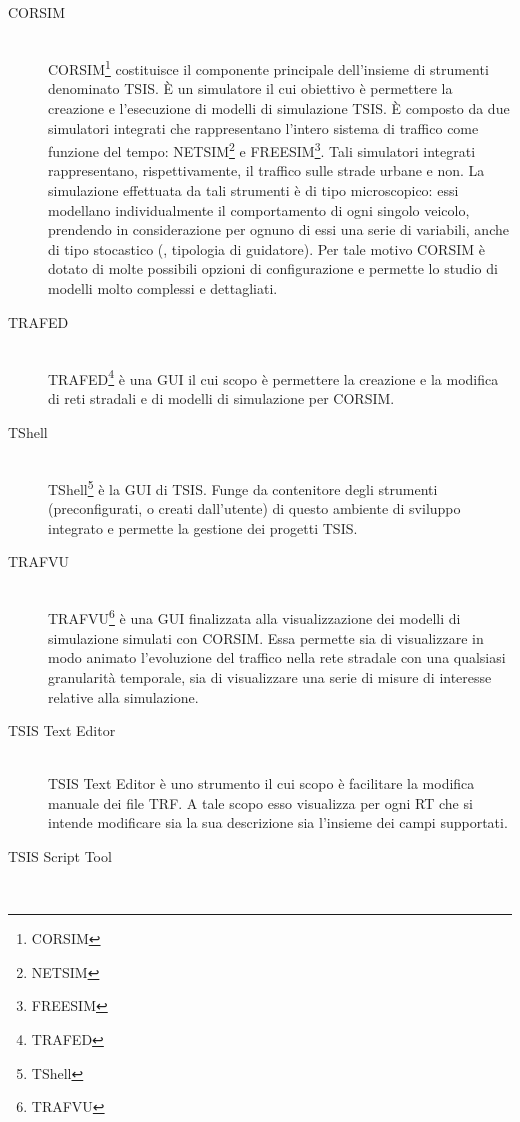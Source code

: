 \begin{description}
\item[CORSIM] \hfill \\
\acs{CORSIM}\footnote{\acf{CORSIM}} costituisce il componente principale dell'insieme di strumenti denominato \acs{TSIS}. È un simulatore il cui obiettivo è permettere la creazione e l'esecuzione di modelli di simulazione \acs{TSIS}. È composto da due simulatori integrati che rappresentano l'intero sistema di traffico come funzione del tempo: \acs{NETSIM}\footnote{\acf{NETSIM}} e \acs{FREESIM}\footnote{\acf{FREESIM}}. Tali simulatori integrati rappresentano, rispettivamente, il traffico sulle strade urbane e non. La simulazione effettuata da tali strumenti è di tipo microscopico: essi modellano individualmente il comportamento di ogni singolo veicolo, prendendo in considerazione per ognuno di essi una serie di variabili, anche di tipo stocastico (\eg{}, tipologia di guidatore). Per tale motivo \acs{CORSIM} è dotato di molte possibili opzioni di configurazione e permette lo studio di modelli molto complessi e dettagliati.
\item[TRAFED] \hfill \\
\acs{TRAFED}\footnote{\acf{TRAFED}} è una \acs{GUI} il cui scopo è permettere la creazione e la modifica di reti stradali e di modelli di simulazione per \acs{CORSIM}.
\item[TShell] \hfill \\
\acs{TShell}\footnote{\acf{TShell}} è la \acs{GUI} di \acs{TSIS}. Funge da contenitore degli strumenti (preconfigurati, o creati dall'utente) di questo ambiente di sviluppo integrato e permette la gestione dei progetti \acs{TSIS}.
\item[TRAFVU] \hfill \\
\acs{TRAFVU}\footnote{\acf{TRAFVU}} è una \acs{GUI} finalizzata alla visualizzazione dei modelli di simulazione simulati con \acs{CORSIM}. Essa permette sia di visualizzare in modo animato l'evoluzione del traffico nella rete stradale con una qualsiasi granularità temporale, sia di visualizzare una serie di misure di interesse relative alla simulazione.
\item[TSIS Text Editor] \hfill \\
\acs{TSIS} Text Editor è uno strumento il cui scopo è facilitare la modifica manuale dei file \acs{TRF}. A tale scopo esso visualizza per ogni \acs{RT} che si intende modificare sia la sua descrizione sia l'insieme dei campi supportati.
\item[TSIS Script Tool] \hfill \\

\end{description}
